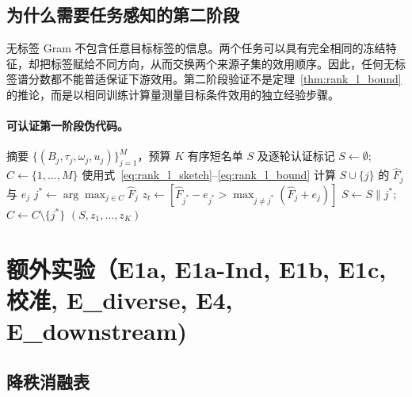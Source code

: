\documentclass{article}
\begin{document}
\subsection{为什么需要任务感知的第二阶段}
\label{sec:transfer_connection}

无标签 Gram 不包含任意目标标签的信息。两个任务可以具有完全相同的冻结特征，却把标签赋给不同方向，从而交换两个来源子集的效用顺序。因此，任何无标签谱分数都不能普适保证下游效用。第二阶段验证不是定理~\ref{thm:rank_l_bound} 的推论，而是以相同训练计算量测量目标条件效用的独立经验步骤。

\paragraph{可认证第一阶段伪代码。}

\begin{algorithm}[h]
\caption{Collapse-Gram-$L$ Greedy 筛选}
\label{alg:collapse_greedy}
\begin{algorithmic}[1]
\Require 摘要 $\{(B_j,\tau_j,\omega_j,u_j)\}_{j=1}^M$，预算 $K$
\Ensure 有序短名单 $S$ 及逐轮认证标记
\State $S\gets\emptyset$;\quad $C\gets\{1,\ldots,M\}$
    \State 使用式~\eqref{eq:rank_l_sketch}--\eqref{eq:rank_l_bound} 计算 $S\cup\{j\}$ 的 $\widehat F_j$ 与 $e_j$
  \EndFor
  \State $j^*\gets\arg\max_{j\in C}\widehat F_j$
  \State $z_t\gets[\widehat F_{j^*}-e_{j^*}>\max_{j\neq j^*}(\widehat F_j+e_j)]$
  \State $S\gets S\mathbin{\|}j^*$;\quad $C\gets C\setminus\{j^*\}$
\EndFor
\State \Return $(S,z_1,\ldots,z_K)$
\end{algorithmic}
\end{algorithm}
\section{额外实验（E1a, E1a-Ind, E1b, E1c, 校准, E\_diverse, E4, E\_downstream)}
\label{app:exp_extras}
\label{app:ablation_extra}

\subsection{降秩消融表}
\end{document}
